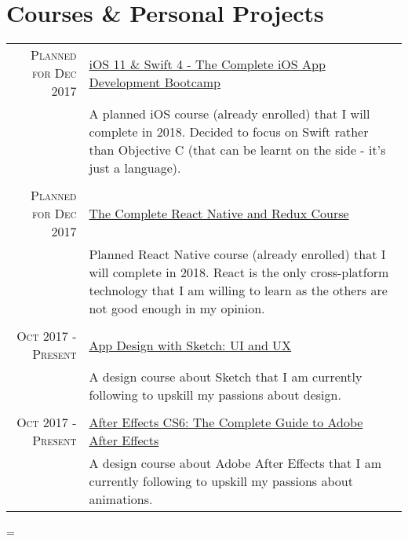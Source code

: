 \documentclass[a4paper,10pt,notitlepage]{article}
\newenvironment{absolutelynopagebreak}
  {\par\nobreak\vfil\penalty0\vfilneg
   \vtop\bgroup}
  {\par\xdef\tpd{\the\prevdepth}\egroup
   \prevdepth=\tpd}
\begin{document}
\begin{absolutelynopagebreak}
	
	\section{Courses \& Personal Projects}
	\begin{tabular}{r|p{11cm}}
	
		\textsc{Planned for Dec 2017} &                                                                                                                  
		\href{https://www.udemy.com/ios-11-app-development-bootcamp/learn/v4/overview}{iOS 11 \& Swift 4 - The Complete iOS App Development Bootcamp}\\&\footnotesize{A planned iOS course (already enrolled) that I will complete in 2018. Decided to focus on Swift rather than Objective C (that can be learnt on the side - it's just a language).} \\
		
		\multicolumn{2}{c}{} \\
		\textsc{Planned for Dec 2017} &                                                                                                                  
		\href{https://www.udemy.com/the-complete-react-native-and-redux-course/learn/v4/overview}{The Complete React Native and Redux Course}\\&\footnotesize{Planned React Native course (already enrolled) that I will complete in 2018. React is the only cross-platform technology that I am willing to learn as the others are not good enough in my opinion.} \\
		
		\multicolumn{2}{c}{} \\
		\textsc{Oct 2017 - Present} &                                                                                                                  
		\href{https://www.udemy.com/app-design-with-sketch-ui-and-ux/}{App Design with Sketch: UI and UX}\\&\footnotesize{A design course about Sketch that I am currently following to upskill my passions about design.} \\
		
		\multicolumn{2}{c}{} \\
		\textsc{Oct 2017 - Present} &                                                                                                                  
		\href{https://www.udemy.com/aftereffects/}{After Effects CS6: The Complete Guide to Adobe After Effects}\\&\footnotesize{A design course about Adobe After Effects that I am currently following to upskill my passions about animations.} \\
		

\end{tabular}
\end{absolutelynopagebreak}
\end{document}
